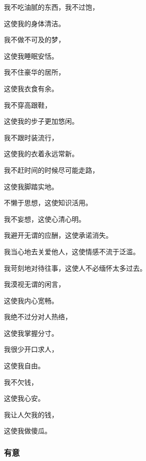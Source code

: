 \par 我不吃油腻的东西，我不过饱，
\par 这使我的身体清洁。
\par 
\par 我不做不可及的梦，
\par 这使我睡眠安恬。
\par 
\par 我不住豪华的居所，
\par 这使我衣食有余。
\par 
\par 我不穿高跟鞋，
\par 这使我的步子更加悠闲。
\par 
\par 我不跟时装流行，
\par 这使我的衣着永远常新。
\par 
\par 我不赶时间的时候尽可能走路，
\par 这使我脚踏实地。
\par 
\par 不懒于思想，这使知识活用。
\par 我不妄想，这使心清心明。
\par 
\par 我避开无谓的应酬，这使承诺消失。
\par 
\par 我当心地去关爱他人，这使情感不流于泛滥。
\par 
\par 我苛刻地对待往事，这使人不必缅怀太多过去。
\par 
\par 我漠视无谓的闲言，
\par 这使我内心宽畅。
\par 
\par 我绝不过分对人热络，
\par 这使我掌握分寸。
\par 
\par 我很少开口求人，
\par 这使我自由。
\par 
\par 我不欠钱，
\par 这使我心安。
\par 
\par 我让人欠我的钱，
\par 这使我做傻瓜。



\subsubsection{有意}


